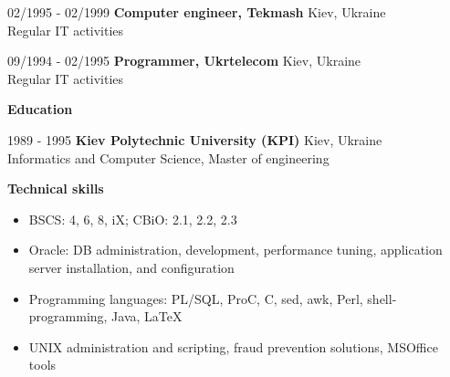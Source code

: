 \documentclass[10pt,a4paper]{extbook}
\begin{document}
\par\vspace{5mm}
02/1995 - 02/1999 \hspace{10mm} \textbf{Computer engineer, Tekmash} \hfill Kiev, Ukraine \\
Regular IT activities

\par\vspace{5mm}
09/1994 - 02/1995 \hspace{10mm} \textbf{Programmer, Ukrtelecom} \hfill Kiev, Ukraine \\
Regular IT activities

\par\vspace{5mm}
{\large \textbf {Education} \par}
\vspace{2mm}
1989 - 1995 \hspace{10mm} \textbf{Kiev Polytechnic University (KPI)} \hfill Kiev, Ukraine \\
Informatics and Computer Science, Master of engineering

\par\vspace{5mm}
{\large \textbf {Technical skills} \par}
\begin{itemize}[noitemsep,topsep=3mm,parsep=0pt,partopsep=0pt,itemindent=0pt,leftmargin=4mm]
	\item BSCS: 4, 6, 8, iX; CBiO: 2.1, 2.2, 2.3
	\item Oracle: DB administration, development, performance tuning, application server installation, and configuration
	\item Programming languages: PL/SQL, ProC, C, sed, awk, Perl, shell-programming, Java, LaTeX
	\item UNIX administration and scripting, fraud prevention solutions, MSOffice tools
\end{itemize}
\end{document}
